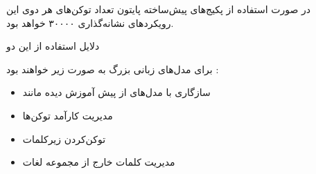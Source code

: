 \begin{boxC}
    در صورت استفاده از پکیج‌های پیش‌ساخته پایتون تعداد توکن‌های هر دوی این رویکردهای نشانه‌گذاری ۳۰۰۰۰ خواهد بود.
\end{boxC}

\begin{boxC}
    دلایل استفاده از این دو 

    برای مدل‌های زبانی بزرگ به صورت زیر خواهند بود :
    \begin{itemize}
        \item 
        سازگاری با مدل‌های از پیش آموزش دیده مانند 
        
        \item 
        مدیریت کارآمد توکن‌ها
        
        \item 
        توکن‌کردن زیرکلمات

        \item 
        مدیریت کلمات خارج از مجموعه لغات
    \end{itemize}
\end{boxC}
